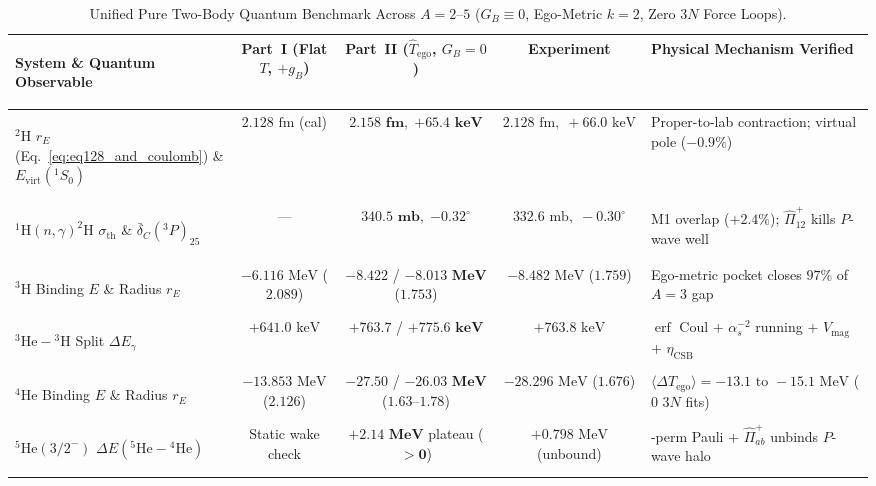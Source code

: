 \documentclass[11pt, a4paper]{article}
\begin{document}
\begin{table}[!htbp]
\centering
\caption{Unified Pure Two-Body Quantum Benchmark Across $A = 2\text{--}5$ ($G_B \equiv 0$, Ego-Metric $k = 2$, Zero $3N$ Force Loops).}
\label{tab:unified_a2_a5_ledger}
\scriptsize
\setlength{\tabcolsep}{3.8pt}
\renewcommand{\arraystretch}{1.16}
\begin{tabularx}{\textwidth}{>{\bfseries\raggedright\arraybackslash}p{} c c c >{\raggedright\arraybackslash}X}
\toprule
System \& Quantum Observable & Part~I (Flat $T$, $+g_B$) & Part~II ($\hat{T}_{\mathrm{ego}}$, $G_B=0$) & Experiment & Physical Mechanism Verified \\
\midrule
$^2\text{H}$ $r_E$ (Eq.~\ref{eq:eq128_and_coulomb}) \& $E_{\mathrm{virt}}(^1S_0)$ & $2.128\text{ fm}$ (cal) & $\mathbf{2.158\text{ fm}},\; \mathbf{+65.4\text{ keV}}$ & $2.128\text{ fm},\; +66.0\text{ keV}$ & Proper-to-lab contraction; virtual pole ($-0.9\%$) \\
$^1\text{H}(n,\gamma)^2\text{H}$ $\sigma_{\mathrm{th}}$ \& $\bar{\delta}_C(^3P)_{25}$ & --- & $\mathbf{340.5\text{ mb}},\; \mathbf{-0.32^\circ}$ & $332.6\text{ mb},\; -0.30^\circ$ & M1 overlap ($+2.4\%$); $\hat{\Pi}_{12}^+$ kills $P$-wave well \\
$^3\text{H}$ Binding $E$ \& Radius $r_E$ & $-6.116\text{ MeV}$ ($2.089$) & $\mathbf{-8.422}$ / $\mathbf{-8.013\text{ MeV}}$ ($1.753$) & $-8.482\text{ MeV}$ ($1.759$) & Ego-metric pocket closes $97\%$ of $A=3$ gap \\
$^3\text{He} - {}^3\text{H}$ Split $\Delta E_\gamma$ & $+641.0\text{ keV}$ & $\mathbf{+763.7}$ / $\mathbf{+775.6\text{ keV}}$ & $+763.8\text{ keV}$ & $\operatorname{erf}$ Coul + $\alpha_s^{-2}$ running + $V_{\mathrm{mag}}$ + $\eta_{\mathrm{CSB}}$ \\
$^4\text{He}$ Binding $E$ \& Radius $r_E$ & $-13.853\text{ MeV}$ ($2.126$) & $\mathbf{-27.50}$ / $\mathbf{-26.03\text{ MeV}}$ ($1.63\text{--}1.78$) & $-28.296\text{ MeV}$ ($1.676$) & $\langle\Delta T_{\mathrm{ego}}\rangle = -13.1\text{ to }-15.1\text{ MeV}$ ($0$ $3N$ fits) \\
$^5\text{He}(3/2^-)$ $\Delta E(^5\text{He} - {}^4\text{He})$ & Static wake check & $\mathbf{+2.14\text{ MeV}}$ plateau ($\mathbf{> 0}$) & $+0.798\text{ MeV}$ (unbound) & 12-perm Pauli + $\hat{\Pi}_{ab}^+$ unbinds $P$-wave halo \\
\bottomrule
\end{tabularx}
\end{table}

\end{document}
